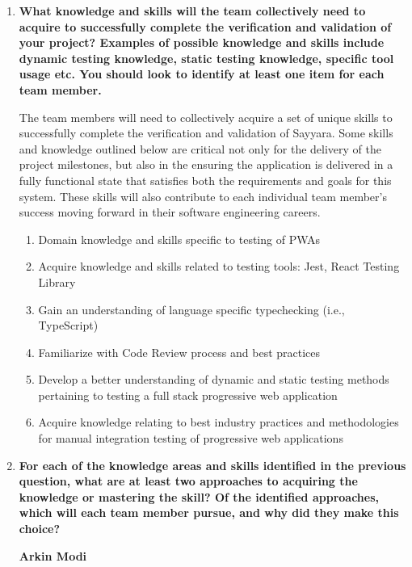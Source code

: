 \documentclass[12pt, titlepage]{article}
\begin{document}
\begin{enumerate}
	\item \textbf{What knowledge and skills will the team collectively need to acquire to successfully complete the
		      verification and validation of your project? Examples of possible knowledge and skills include
		      dynamic testing knowledge, static testing knowledge, specific tool usage etc. You should look to
		      identify at least one item for each team member.}

	      The team members will need to collectively acquire a set of unique skills to successfully complete
	      the verification and validation of Sayyara. Some skills and knowledge outlined below are critical
	      not only for the delivery of the project milestones, but also in the ensuring the application is
	      delivered in a fully functional state that satisfies both the requirements and goals for this
	      system. These skills will also contribute to each individual team member's success moving forward
	      in their software engineering careers.

	      \begin{enumerate}[\arabic*.]
		      \item Domain knowledge and skills specific to testing of PWAs
		      \item Acquire knowledge and skills related to testing tools: Jest, React Testing Library
		      \item Gain an understanding of language specific typechecking (i.e., TypeScript)
		      \item Familiarize with Code Review process and best practices
		      \item Develop a better understanding of dynamic and static testing methods pertaining to testing a full
		            stack progressive web application
		      \item Acquire knowledge relating to best industry practices and methodologies for manual integration
		            testing of progressive web applications
	      \end{enumerate}

	\item \textbf{For each of the knowledge areas and skills identified in the previous question, what are at least
		      two approaches to acquiring the knowledge or mastering the skill? Of the identified approaches,
		      which will each team member pursue, and why did they make this choice?}

	      \textbf{Arkin Modi}


\end{enumerate}
\end{document}
